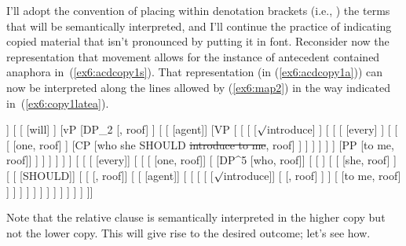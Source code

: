 I'll adopt the convention of placing within denotation brackets (i.e., \denotes{\ }) the terms that will be semantically interpreted, and I'll continue the practice of indicating copied material that isn't pronounced by putting it in  font. Reconsider now the representation that movement allows for the instance of antecedent contained anaphora in~(\ref{ex6:acdcopy1s}). That representation (in (\ref{ex6:acdcopy1a})) can now be interpreted along the lines allowed by (\ref{ex6:map2}) in the way indicated in~(\ref{ex6:copy1latea}).
\medskip
\begin{fullwidth}
	\begin{exe}
	\ex \label{ex6:copy1latea}
	\footnotesize
	\begin{forest}
	[TP
		[TP
			[DP^2 [she, roof]]
			[ 
				[ [will] ]
				[vP
					[DP_2 [, roof] ]
					[
						[ [agent]]
						[VP [
							[
							[ [$\surd$introduce] ]
							[ [
								[ [every] ]
								[ [ 
									[ [one, roof] ]
									[CP [who she SHOULD \sout{introduce to me}, roof] ]
								] ]
							]
							]
							]
							[PP [to me, roof]]
						] ]
					 ]
				 ]
			]
		 ]
		[ [
			[ [every]]
			[ [
				[]
				[ 
				[DP^5 [who, roof]]
				[
					[ ]
					[ 
						[ [she, roof] ]
						[
							[ [SHOULD]]
							[
								[ [, roof]]
								[
								[ [agent]]
								[ [
									[ 
										[ [$\surd$introduce]]
										[ [, roof] ]
									]
									[ [to me, roof] ]
								] ]
							 ]
						 ]
					 ]
				] ]
			] ]
		] ]
	]]
	\end{forest}%
\end{exe}
\end{fullwidth}
\medskip
Note that the relative clause is semantically interpreted in the higher copy but not the lower copy. This will give rise to the desired outcome; let's see how.

